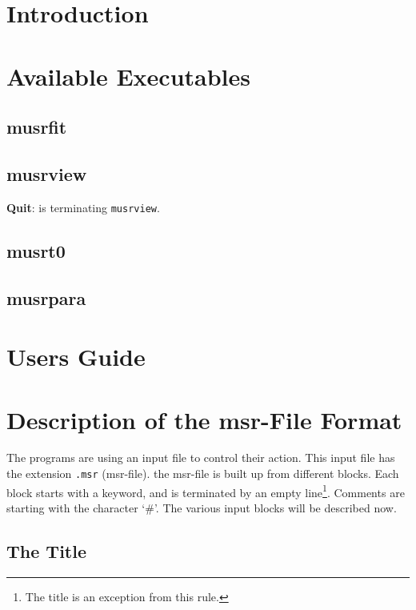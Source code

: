 \documentclass[twoside]{article}
\begin{document}
\tableofcontents

\section{Introduction}\label{sec:introduction}%

\section{Available Executables}\label{sec:available-executables}%

\subsection{musrfit}\label{subsec:musrfit}%
\subsection{musrview}\label{subsec:musrview}%
 \textbf{Quit}: is terminating \texttt{musrview}.

\subsection{musrt0}\label{subsec:musrt0}%
\subsection{musrpara}\label{subsec:musrpara}%

\section{Users Guide}\label{sec:user-guide}%

\section{Description of the msr-File Format}\label{sec:msr-file}%

The programs are using an input file to control their action. This input file has the extension \texttt{.msr} (msr-file). the msr-file is built up from different blocks. Each block starts with a keyword, and is terminated by an empty line\footnote{The title is an exception from this rule.}. Comments are starting with the character `\#'. The various input blocks will be described now.

\subsection{The Title}\label{subsec:msr-file-title}%
\end{document}
